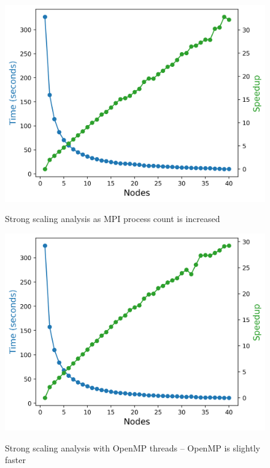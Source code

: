 \begin{figure}[h]
\begin{minipage}{0.45\linewidth}
        \label{fig:omp_weak2}
    \end{minipage}
  \begin{minipage}{0.45\linewidth}
      \includegraphics[width=\linewidth]{figs/mpi_strong.out}
	  \caption{Strong scaling analysis as MPI process count is increased}
      \label{fig:mpi_strong}
    \end{minipage}
  \hspace{.05\linewidth}
 \begin{minipage}{0.45\linewidth}
  \includegraphics[width=\linewidth]{figs/omp_strong.out}
  \caption{Strong scaling analysis with OpenMP threads -- OpenMP is slightly faster}
    \label{fig:omp_strong}
    \end{minipage}
\end{figure}

